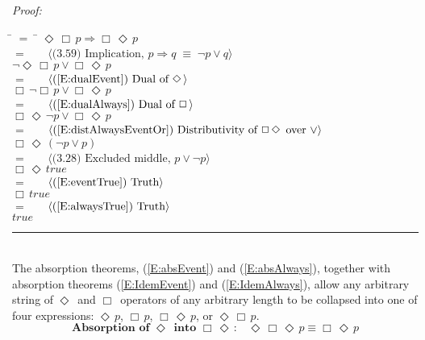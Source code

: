 \documentclass[fleqn, leqno]{article}
\newcommand{\lgap}{2pt}                             %
\newcommand{\mymathindent}{24pt}                    %
\newcommand{\equivs}{\ensuremath{\;\equiv\;}}       %
\newcommand{\impl}{\ensuremath{\Rightarrow}}        %
\newcommand{\Event}{\Diamond\,}
\newcommand{\Always}{\Box\,}
\newcommand{\myqed}{\hfill\rule[-.23ex]{1.2ex}{2.0ex}}
\newcommand{\Gll} {\langle}                         %
\newcommand{\Ggg} {\rangle}                         %
\newcommand{\Hint}[1]     {\ \ \ $\Gll              \mbox{#1} \Ggg$ }   %
\begin{document}
\emph{Proof:}
\begin{tabbing}
\hspace{\mymathindent} \= $= \;$ \= \kill
  \> \>   $\Event\Always p \impl \Always\Event p$\\[\lgap]
  \> $=$  \>  \Hint{(3.59) Implication, $p\impl q \equivs \neg p \lor q$}\\[\lgap]
  \> \>   $\neg\Event\Always p \lor \Always\Event p$\\[\lgap]
  \> $=$  \>  \Hint{(\ref{E:dualEvent}) Dual of $\Event$}\\[\lgap]
  \> \>   $\Always\neg\Always p \lor \Always\Event p$\\[\lgap]  
  \> $=$  \>  \Hint{(\ref{E:dualAlways}) Dual of $\Always$}\\[\lgap]
  \> \>   $\Always\Event\neg p \lor \Always\Event p$\\[\lgap]
  \> $=$  \>  \Hint{(\ref{E:distAlwaysEventOr}) Distributivity of $\Always\Event$ over $\lor$}\\[\lgap]
  \> \>   $\Always\Event(\neg p \lor p)$\\[\lgap]
  \> $=$  \>  \Hint{(3.28) Excluded middle, $p\lor\neg p$}\\[\lgap]
  \> \>   $\Always\Event true$\\[\lgap]
  \> $=$  \>  \Hint{(\ref{E:eventTrue}) Truth}\\[\lgap]
  \> \>   $\Always true$\\[\lgap]
  \> $=$  \>  \Hint{(\ref{E:alwaysTrue}) Truth}\\[\lgap]
  \> \>   $true$
\end{tabbing}
\myqed\\[\lgap]

The absorption theorems, (\ref{E:absEvent}) and (\ref{E:absAlways}), together with absorption theorems
(\ref{E:IdemEvent}) and (\ref{E:IdemAlways}), allow any arbitrary string of $\Event$ and $\Always$ operators
of any arbitrary length to be collapsed into one of four expressions: \;$\Event p$, \;$\Always p$,
\;$\Always\Event p$, or \;$\Event\Always p$.
\begin{equation}\label{E:absEvent}
\textbf{Absorption of $\Event$ into $\Always\Event$:}\quad \Event\Always\Event p \equiv \Always\Event p
\end{equation}
\end{document}
